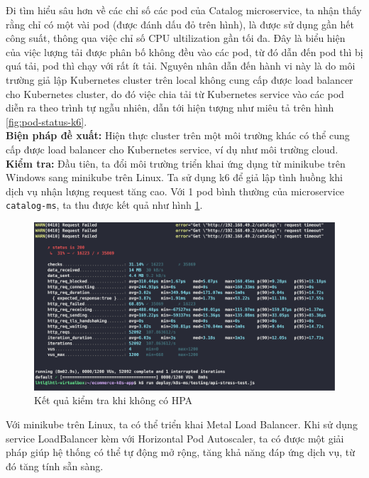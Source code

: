 Đi tìm hiểu sâu hơn về các chỉ số các pod của Catalog microservice, ta nhận thấy rằng chỉ có một vài pod (được đánh dấu đỏ trên hình), là được sử dụng gần hết công suất, thông qua việc chỉ số CPU ultilization gần tối đa. 
Đây là biểu hiện của việc lượng tải được phân bố không đều vào các pod, từ đó dẫn đến pod thì bị quá tải, pod thì chạy với rất ít tải. Nguyên nhân dẫn đến hành vi này là do môi trường giả lập Kubernetes cluster trên local không cung cấp được load balancer cho Kubernetes cluster, do đó việc chia tải từ Kubernetes service vào các pod diễn ra theo trình tự ngẫu nhiên, dẫn tới hiện tượng như miêu tả trên hình \ref{fig:pod-status-k6}.\\[0.5cm]
\textbf{Biện pháp đề xuất:} Hiện thực cluster trên một môi trường khác có thể cung cấp được load balancer cho Kubernetes service, ví dụ như môi trường cloud.\\[0.5cm]
\noindent \textbf{Kiểm tra:} Đầu tiên, ta đổi môi trường triển khai ứng dụng từ minikube trên Windows sang minikube trên Linux. Ta sử dụng k6 để giả lập tình huồng khi dịch vụ nhận lượng request tăng cao. Với 1 pod bình thường của microservice \lstinline|catalog-ms|, ta thu được kết quả như hình \ref{fig:catalog-stress-test-no-hpa}.
\begin{figure}[H]
  \begin{center}
    \includegraphics[scale=0.15]{images/hanh/component-catalog-no-hpa}
  \end{center}
  \caption{Kết quả kiểm tra khi không có HPA}
  \label{fig:catalog-stress-test-no-hpa}

\end{figure}

Với minikube trên Linux, ta có thể triển khai Metal Load Balancer. Khi sử dụng service LoadBalancer kèm với Horizontal Pod Autoscaler, ta có được một giải pháp giúp hệ thống có thể tự động mở rộng, tăng khả năng đáp ứng dịch vụ, từ đó tăng tính sẵn sàng.

